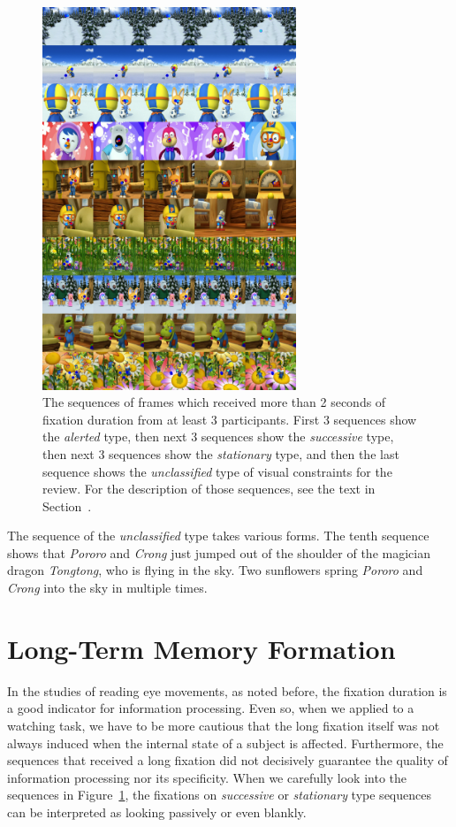 \documentclass[10pt,letterpaper]{article}
\begin{document}
\begin{figure}
  \centerline{\includegraphics[width=76mm]{./eps/long_fixations_types.png}}
  \caption[The samples of sequence types]{The sequences of frames which received more than 2 seconds of fixation duration from at least 3 participants. First 3 sequences show the \textit{alerted} type, then next 3 sequences show the \textit{successive} type, then next 3 sequences show the \textit{stationary} type, and then the last sequence shows the \textit{unclassified} type of visual constraints for the review. For the description of those sequences, see the text in Section~\textit{}.}
  \label{fig:long-fixations}
\end{figure}

The sequence of the \textit{unclassified} type takes various forms. The tenth sequence shows that \textit{Pororo} and \textit{Crong} just jumped out of the shoulder of the magician dragon \textit{Tongtong}, who is flying in the sky. Two sunflowers spring \textit{Pororo} and \textit{Crong} into the sky in multiple times. 



\section{Long-Term Memory Formation}

In the studies of reading eye movements, as noted before, the fixation duration is a good indicator for information processing. Even so, when we applied to a watching task, we have to be more cautious that the long fixation itself was not always induced when the internal state of a subject is affected. Furthermore, the sequences that received a long fixation did not decisively guarantee the quality of information processing nor its specificity. When we carefully look into the sequences in Figure~\ref{fig:long-fixations}, the fixations on \textit{successive} or \textit{stationary} type sequences can be interpreted as looking passively or even blankly.
\end{document}
